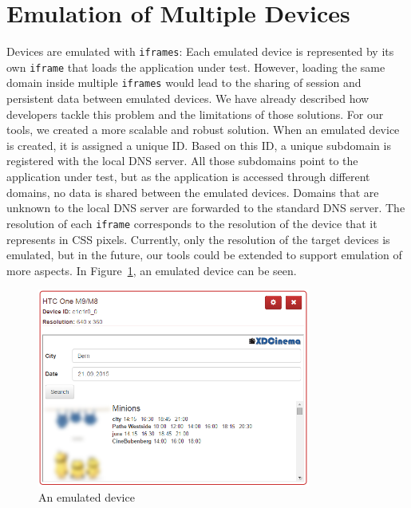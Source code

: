 \section{Emulation of Multiple Devices}

Devices are emulated with \lstinline|iframes|: Each emulated device is represented by its own \lstinline|iframe| that loads the application under test. However, loading the same domain inside multiple \lstinline|iframes| would lead to the sharing of session and persistent data between emulated devices. We have already described how developers tackle this problem and the limitations of those solutions. For our tools, we created a more scalable and robust solution. When an emulated device is created, it is assigned a unique ID. Based on this ID, a unique subdomain is registered with the local DNS server. All those subdomains point to the application under test, but as the application is accessed through different domains, no data is shared between the emulated devices. Domains that are unknown to the local DNS server are forwarded to the standard DNS server. The resolution of each \lstinline|iframe| corresponds to the resolution of the device that it represents in CSS pixels. Currently, only the resolution of the target devices is emulated, but in the future, our tools could be extended to support emulation of more aspects. In Figure~\ref{fig:emulated_device}, an emulated device can be seen.

\begin{figure}[H]
  \centering
    \includegraphics[width=0.8\textwidth]{images/screenshots/emulated_device_3.png}
	\caption[Screenshot: Emulated device]{An emulated device}
	\label{fig:emulated_device}
\end{figure}

